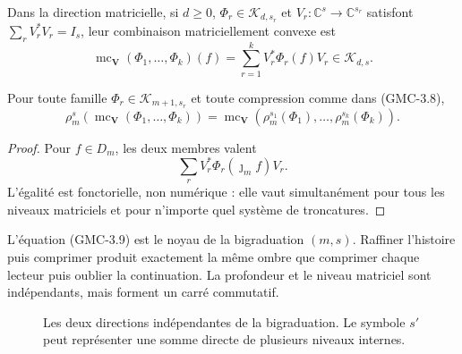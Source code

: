 Dans la direction matricielle, si $d\ge0$,
$\Phi_r\in\mathcal K_{d,s_r}$ et
$V_r:\mathbb C^s\to\mathbb C^{s_r}$ satisfont
$\sum_rV_r^*V_r=I_s$, leur combinaison matriciellement convexe est
\[
 \operatorname{mc}_{\boldsymbol V}(\Phi_1,\ldots,\Phi_k)(f)
 =\sum_{r=1}^kV_r^*\Phi_r(f)V_r
 \in\mathcal K_{d,s}.
 \tag{GMC-3.8}
\]

\begin{theorem}
\label{p12-83-c22-s4:gmc:thm:conmutacion-ms}
Pour toute famille $\Phi_r\in\mathcal K_{m+1,s_r}$ et toute compression comme dans
\textup{(GMC-3.8)},
\[
 \rho_m^s\!\left(
   \operatorname{mc}_{\boldsymbol V}(\Phi_1,\ldots,\Phi_k)
 \right)
 =
 \operatorname{mc}_{\boldsymbol V}\!\left(
   \rho_m^{s_1}(\Phi_1),\ldots,\rho_m^{s_k}(\Phi_k)
 \right).
 \tag{GMC-3.9}
\]
\end{theorem}

\begin{proof}
Pour $f\in D_m$, les deux membres valent
\[
 \sum_rV_r^*\Phi_r(\jmath_m f)V_r.
\]
L'égalité est fonctorielle, non numérique : elle vaut simultanément pour tous les
niveaux matriciels et pour n'importe quel système de troncatures.
\end{proof}

\begin{bridgebox}
L'équation \textup{(GMC-3.9)} est le noyau de la bigraduation $(m,s)$. Raffiner
l'histoire puis comprimer produit exactement la même ombre que
comprimer chaque lecteur puis oublier la continuation. La profondeur et le
niveau matriciel sont indépendants, mais forment un carré commutatif.
\end{bridgebox}

\begin{figure}[H]
\centering
{}
\caption{Les deux directions indépendantes de la bigraduation. Le symbole
$s'$ peut représenter une somme directe de plusieurs niveaux internes.}
\label{p12-83-c22-s4:gmc:fig:cuadrado-ms}
\end{figure}

